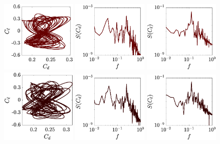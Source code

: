 \begin{figure}
  \includegraphics[width=0.325\textwidth]{./fig/AR4p5/Cl_Cd_Re475.eps}
  \includegraphics[width=0.325\textwidth]{./fig/AR4p5/Cd_f_Re475.eps}
  \includegraphics[width=0.325\textwidth]{./fig/AR4p5/Cl_f_Re475.eps}     
  \includegraphics[width=0.325\textwidth]{./fig/AR4p5/Cl_Cd_Re500.eps}
  \includegraphics[width=0.325\textwidth]{./fig/AR4p5/Cd_f_Re500.eps}
  \includegraphics[width=0.325\textwidth]{./fig/AR4p5/Cl_f_Re500.eps}      

\end{figure}

